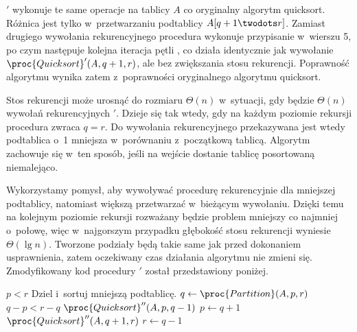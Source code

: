 
\subproblem %
$'$ wykonuje te same operacje na tablicy $A$ co oryginalny algorytm quicksort.
Różnica jest tylko w~przetwarzaniu podtablicy $A[q+1\twodots r]$.
Zamiast drugiego wywołania rekurencyjnego procedura wykonuje przypisanie w~wierszu 5, po czym następuje kolejna iteracja pętli , co działa identycznie jak wywołanie $\proc{Quicksort}'(A,q+1,r)$, ale bez zwiększania stosu rekurencji.
Poprawność algorytmu wynika zatem z~poprawności oryginalnego algorytmu quicksort.

\subproblem %
Stos rekurencji może urosnąć do rozmiaru $\Theta(n)$ w~sytuacji, gdy będzie $\Theta(n)$ wywołań rekurencyjnych $'$.
Dzieje się tak wtedy, gdy na każdym poziomie rekursji procedura  zwraca $q=r$.
Do wywołania rekurencyjnego przekazywana jest wtedy podtablica o~1 mniejsza w~porównaniu z~początkową tablicą.
Algorytm zachowuje się w~ten sposób, jeśli na wejście dostanie tablicę posortowaną niemalejąco.

\subproblem %
Wykorzystamy pomysł, aby wywoływać procedurę rekurencyjnie dla mniejszej podtablicy, natomiast większą przetwarzać w~bieżącym wywołaniu.
Dzięki temu na kolejnym poziomie rekursji rozważany będzie problem mniejszy co najmniej o~połowę, więc w~najgorszym przypadku głębokość stosu rekurencji wyniesie $\Theta(\lg n)$.
Tworzone podziały będą takie same jak przed dokonaniem usprawnienia, zatem oczekiwany czas działania algorytmu nie zmieni się.
Zmodyfikowany kod procedury $'$ został przedstawiony poniżej.
\begin{codebox}
\li	\While $p<r$
\li		\Do \Comment Dziel i~sortuj mniejszą podtablicę.
\li			$q\gets\proc{Partition}(A,p,r)$
\li			\If $q-p<r-q$
\li				\Then $\proc{Quicksort}''(A,p,q-1)$
\li					$p\gets q+1$
\li				\Else $\proc{Quicksort}''(A,q+1,r)$
\li					$r\gets q-1$
				\End
		\End
\end{codebox}
